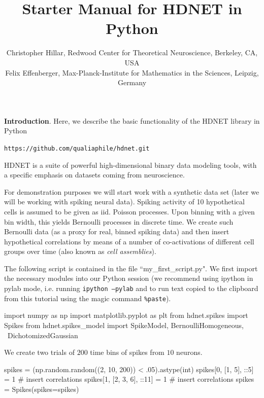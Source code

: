 \documentclass[letter, 12pt]{article}
\theoremstyle{definition}
\theoremstyle{remark}
\begin{document}
\title{Starter Manual for HDNET in Python}
\author{\normalsize Christopher Hillar, Redwood Center for Theoretical Neuroscience, Berkeley, CA, USA\\
\normalsize Felix Effenberger, Max-Planck-Institute for Mathematics in the Sciences, Leipzig, Germany
}
\date{}



\maketitle

\textbf{Introduction}.  Here, we describe the basic functionality of the HDNET library in Python

\begin{center}
\texttt{https://github.com/qualiaphile/hdnet.git} \\
\end{center}

HDNET is a suite of powerful high-dimensional binary data modeling tools, with a specific emphasis on datasets coming from neuroscience.

For demonstration purposes we will start work with a synthetic data set  (later we will be working with spiking neural data). Spiking activity of 10 hypothetical cells is assumed to be given as iid. Poisson processes. Upon binning with a given bin width, this yields Bernoulli processes in discrete time. We create such Bernoulli data (as a proxy for real, binned spiking data) and then insert hypothetical correlations by means of a number of co-activations of different cell groups over time (also known as \textit{cell assemblies}).

The following script is contained in the file ``my\_first\_script.py".  We first import the necessary modules into our Python session (we recommend using ipython in pylab mode, i.e. running \texttt{ipython --pylab} and to run text copied to the clipboard from this tutorial using the magic command \texttt{\%paste}).

\begin{python}
import numpy as np
import matplotlib.pyplot as plt
from hdnet.spikes import Spikes
from hdnet.spikes_model import SpikeModel, BernoulliHomogeneous, \
	DichotomizedGaussian
\end{python}

We create two trials of $200$ time bins of spikes from $10$ neurons.

\begin{python}
spikes = (np.random.random((2, 10, 200)) < .05).astype(int)
spikes[0, [1, 5], ::5] = 1 # insert correlations
spikes[1, [2, 3, 6], ::11] = 1  # insert correlations
spikes = Spikes(spikes=spikes)
\end{python}
\end{document}
